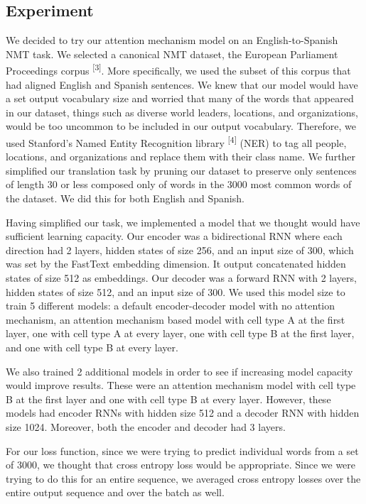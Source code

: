 \documentclass[letterpaper, 10pt]{article}
\begin{document}
\begin{multicols}{2}
\section{Experiment}

We decided to try our attention mechanism model on an English-to-Spanish NMT task.
We selected a canonical NMT dataset, the European Parliament Proceedings corpus
\textsuperscript{[3]}.
More specifically, we used the subset of this corpus that had aligned English and Spanish sentences.
We knew that our model would have a set output vocabulary size and worried that many of the words
that appeared in our dataset, things such as diverse world leaders, locations, and organizations,
would be too uncommon to be included in our output vocabulary.
Therefore, we used Stanford’s Named Entity Recognition library \textsuperscript{[4]} (NER)
to tag all people, locations, and organizations and replace them with their class name.
We further simplified our translation task by pruning our dataset to preserve only sentences of
length 30 or less composed only of words in the 3000 most common words of the dataset.
We did this for both English and Spanish.

Having simplified our task, we implemented a model that we thought would have sufficient learning
capacity.
Our encoder was a bidirectional RNN where each direction had 2 layers, hidden states of size 256,
and an input size of 300, which was set by the FastText embedding dimension.
It output concatenated hidden states of size 512 as embeddings.
Our decoder was a forward RNN with 2 layers, hidden states of size 512, and an input size of 300.
We used this model size to train 5 different models: a default encoder-decoder model with no
attention mechanism, an attention mechanism based model with cell type A at the first
layer, one with cell type A at every layer, one with cell type B at the first
layer, and one with cell type B at every layer.

We also trained 2 additional models in order to see if increasing model capacity would improve
results.
These were an attention mechanism model with cell type B at the first layer and one with
cell type B at every layer.
However, these models had encoder RNNs with hidden size 512 and a decoder RNN with hidden size
1024.
Moreover, both the encoder and decoder had 3 layers.

For our loss function, since we were trying to predict individual words from a set of 3000, we
thought that cross entropy loss would be appropriate. Since we were trying to do this for an entire
sequence, we averaged cross entropy losses over the entire output sequence and over the batch as
well.


\end{multicols}
\end{document}
